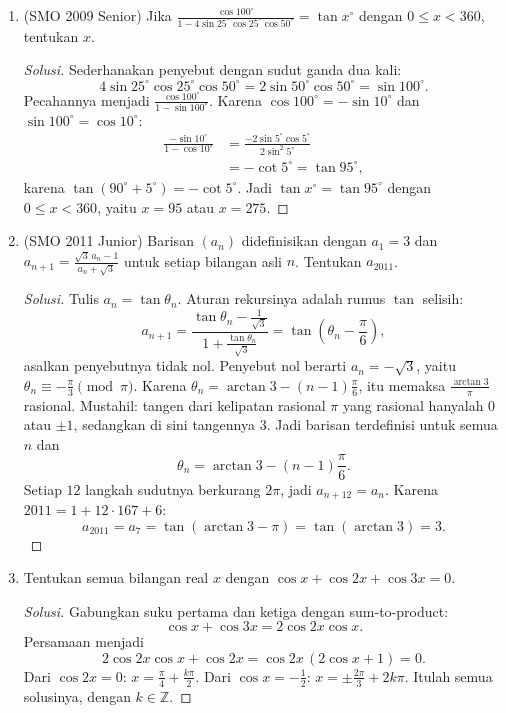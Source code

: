 \documentclass[12pt]{scrartcl}
\begin{document}
\begin{enumerate}

	\item (SMO 2009 Senior)
	Jika $\frac{\cos 100^{\circ}}
	{1-4\sin 25^{\circ}\cos 25^{\circ}\cos 50^{\circ}} = \tan x^{\circ}$
	dengan $0 \le x < 360$, tentukan $x$.
	\begin{proof}[Solusi]
	Sederhanakan penyebut dengan sudut ganda dua kali:
	\[ 4\sin 25^{\circ}\cos 25^{\circ}\cos 50^{\circ}
	= 2\sin 50^{\circ}\cos 50^{\circ} = \sin 100^{\circ}. \]
	Pecahannya menjadi $\frac{\cos 100^{\circ}}{1-\sin 100^{\circ}}$.
	Karena $\cos 100^{\circ} = -\sin 10^{\circ}$ dan $\sin 100^{\circ} = \cos 10^{\circ}$:
	\begin{align*}
	\frac{-\sin 10^{\circ}}{1-\cos 10^{\circ}}
	&= \frac{-2\sin 5^{\circ}\cos 5^{\circ}}{2\sin^2 5^{\circ}} \\
	&= -\cot 5^{\circ} = \tan 95^{\circ},
	\end{align*}
	karena $\tan(90^{\circ}+5^{\circ}) = -\cot 5^{\circ}$.
	Jadi $\tan x^{\circ} = \tan 95^{\circ}$ dengan $0 \le x < 360$,
	yaitu $x = 95$ atau $x = 275$.
	\end{proof}

	\item (SMO 2011 Junior)
	Barisan $(a_n)$ didefinisikan dengan $a_1 = 3$ dan
	$a_{n+1} = \frac{\sqrt{3}\,a_n-1}{a_n+\sqrt{3}}$ untuk setiap bilangan asli $n$.
	Tentukan $a_{2011}$.
	\begin{proof}[Solusi]
	Tulis $a_n = \tan\theta_n$. Aturan rekursinya adalah rumus $\tan$ selisih:
	\[ a_{n+1} = \frac{\tan\theta_n - \frac{1}{\sqrt{3}}}{1 + \frac{\tan\theta_n}{\sqrt{3}}}
	= \tan\left(\theta_n - \frac{\pi}{6}\right), \]
	asalkan penyebutnya tidak nol. Penyebut nol berarti $a_n = -\sqrt{3}$,
	yaitu $\theta_n \equiv -\frac{\pi}{3} \pmod{\pi}$. Karena
	$\theta_n = \arctan 3 - (n-1)\frac{\pi}{6}$, itu memaksa
	$\frac{\arctan 3}{\pi}$ rasional. Mustahil: tangen dari kelipatan rasional
	$\pi$ yang rasional hanyalah $0$ atau $\pm 1$, sedangkan di sini tangennya $3$.
	Jadi barisan terdefinisi untuk semua $n$ dan
	\[ \theta_n = \arctan 3 - (n-1)\frac{\pi}{6}. \]
	Setiap $12$ langkah sudutnya berkurang $2\pi$, jadi $a_{n+12} = a_n$.
	Karena $2011 = 1 + 12\cdot 167 + 6$:
	\[ a_{2011} = a_7 = \tan(\arctan 3 - \pi) = \tan(\arctan 3) = 3. \]
	\end{proof}

	\item
	Tentukan semua bilangan real $x$ dengan $\cos x + \cos 2x + \cos 3x = 0$.
	\begin{proof}[Solusi]
	Gabungkan suku pertama dan ketiga dengan sum-to-product:
	\[ \cos x + \cos 3x = 2\cos 2x\cos x. \]
	Persamaan menjadi
	\[ 2\cos 2x\cos x + \cos 2x = \cos 2x\,(2\cos x + 1) = 0. \]
	Dari $\cos 2x = 0$: $x = \frac{\pi}{4} + \frac{k\pi}{2}$.
	Dari $\cos x = -\frac12$: $x = \pm\frac{2\pi}{3} + 2k\pi$.
	Itulah semua solusinya, dengan $k \in \mathbb{Z}$.
	\end{proof}


\end{enumerate}
\end{document}
